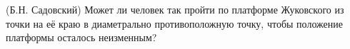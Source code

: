 (Б.Н. Садовский)
Может ли человек так пройти по платформе Жуковского из точки на её краю
в диаметрально противоположную точку, чтобы положение платформы осталось
неизменным?
